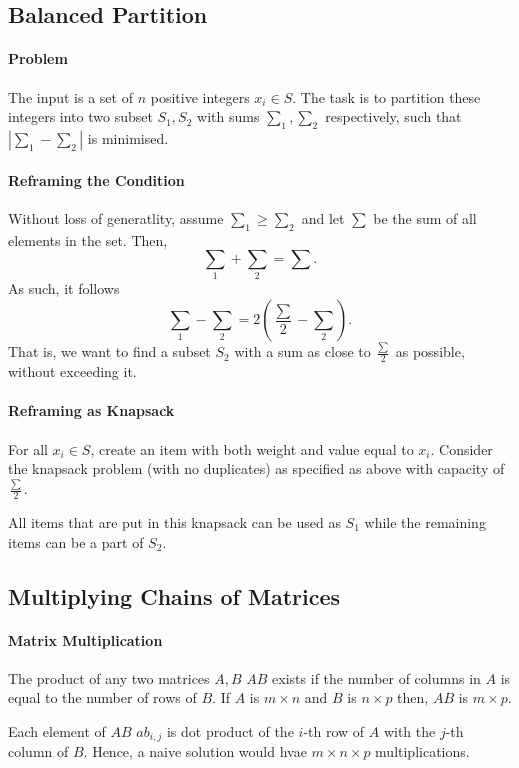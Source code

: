 \subsection{Balanced Partition}

\paragraph{Problem}
The input is a set of \(n\) positive integers  \(x_i \in  S\).
The task is to partition these integers into two subset  \(S_1, S_2\)
with sums \(\sum_1, \sum_2\) respectively, such that \(|\sum_1 - \sum_2|\)
is minimised.

\paragraph{Reframing the Condition}
Without loss of generatlity, assume \(\sum_1 \geq \sum_2\) and let
\(\sum\) be the sum of all elements in the set. Then, \[
  \sum_1 + \sum_2 = \sum
.\] 
As such, it follows \[
  \sum_1 - \sum_2 = 2\left( \frac{\sum}{2} - \sum_2 \right)
.\] 
That is, we want to find a subset \(S_2\) with a sum as close to \(\frac{\sum}{2}\) as possible,
without exceeding it.

\paragraph{Reframing as Knapsack}
For all \(x_i \in  S\), create an item with both weight and value equal to
\(x_i\).
Consider the knapsack problem (with no duplicates) as specified as above
with capacity of \(\frac{\sum}{2}\).

All items that are put in this knapsack can be used as \(S_1\)
while the remaining items can be a part of \(S_2\).

\subsection{Multiplying Chains of Matrices}

\paragraph{Matrix Multiplication}
The product of any two matrices \(A, B\)  \(AB\) exists if the number of
columns in \(A\) is equal to the number of rows of  \(B\).
If \(A\) is  \(m \times n\) and  \(B\) is  \(n\times p\)
then,  \(AB\) is  \(m\times p\).

Each element of \(AB\) \(ab_{i, j}\) is dot product of the \(i\)-th row of \(A\)
with the  \(j\)-th column of \(B\).
Hence, a naive solution would hvae \(m \times n \times p\) multiplications.

